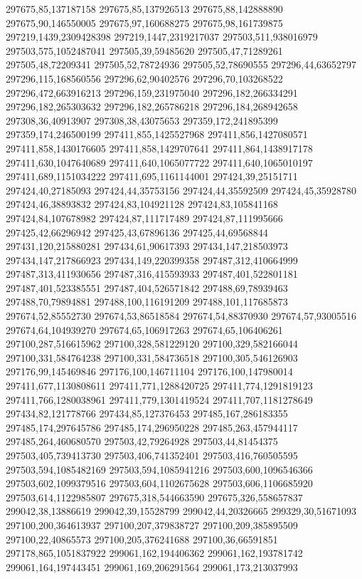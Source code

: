 297675,85,137187158
297675,85,137926513
297675,88,142888890
297675,90,146550005
297675,97,160688275
297675,98,161739875
297219,1439,2309428398
297219,1447,2319217037
297503,511,938016979
297503,575,1052487041
297505,39,59485620
297505,47,71289261
297505,48,72209341
297505,52,78724936
297505,52,78690555
297296,44,63652797
297296,115,168560556
297296,62,90402576
297296,70,103268522
297296,472,663916213
297296,159,231975040
297296,182,266334291
297296,182,265303632
297296,182,265786218
297296,184,268942658
297308,36,40913907
297308,38,43075653
297359,172,241895399
297359,174,246500199
297411,855,1425527968
297411,856,1427080571
297411,858,1430176605
297411,858,1429707641
297411,864,1438917178
297411,630,1047640689
297411,640,1065077722
297411,640,1065010197
297411,689,1151034222
297411,695,1161144001
297424,39,25151711
297424,40,27185093
297424,44,35753156
297424,44,35592509
297424,45,35928780
297424,46,38893832
297424,83,104921128
297424,83,105841168
297424,84,107678982
297424,87,111717489
297424,87,111995666
297425,42,66296942
297425,43,67896136
297425,44,69568844
297431,120,215880281
297434,61,90617393
297434,147,218503973
297434,147,217866923
297434,149,220399358
297487,312,410664999
297487,313,411930656
297487,316,415593933
297487,401,522801181
297487,401,523385551
297487,404,526571842
297488,69,78939463
297488,70,79894881
297488,100,116191209
297488,101,117685873
297674,52,85552730
297674,53,86518584
297674,54,88370930
297674,57,93005516
297674,64,104939270
297674,65,106917263
297674,65,106406261
297100,287,516615962
297100,328,581229120
297100,329,582166044
297100,331,584764238
297100,331,584736518
297100,305,546126903
297176,99,145469846
297176,100,146711104
297176,100,147980014
297411,677,1130808611
297411,771,1288420725
297411,774,1291819123
297411,766,1280038961
297411,779,1301419524
297411,707,1181278649
297434,82,121778766
297434,85,127376453
297485,167,286183355
297485,174,297645786
297485,174,296950228
297485,263,457944117
297485,264,460680570
297503,42,79264928
297503,44,81454375
297503,405,739413730
297503,406,741352401
297503,416,760505595
297503,594,1085482169
297503,594,1085941216
297503,600,1096546366
297503,602,1099379516
297503,604,1102675628
297503,606,1106685920
297503,614,1122985807
297675,318,544663590
297675,326,558657837
299042,38,13886619
299042,39,15528799
299042,44,20326665
299329,30,51671093
297100,200,364613937
297100,207,379838727
297100,209,385895509
297100,22,40865573
297100,205,376241688
297100,36,66591851
297178,865,1051837922
299061,162,194406362
299061,162,193781742
299061,164,197443451
299061,169,206291564
299061,173,213037993
